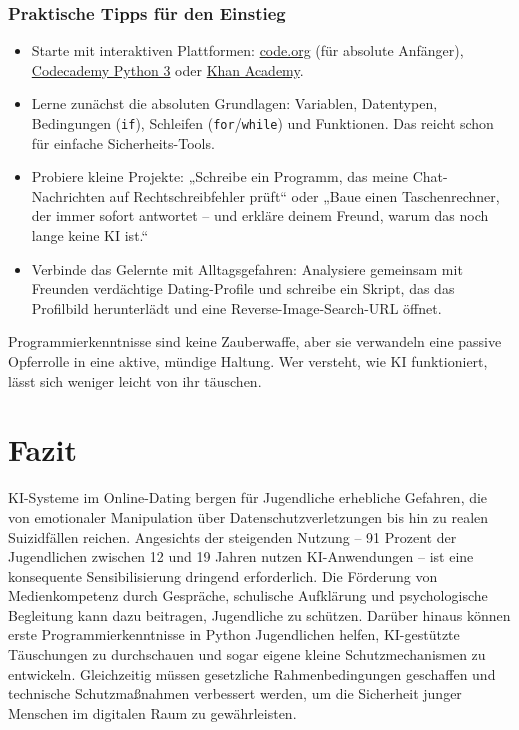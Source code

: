 \documentclass[12pt,a4paper,oneside]{scrartcl}
\begin{document}
	\subsubsection{Praktische Tipps für den Einstieg}
	
	\begin{itemize}
		\item Starte mit interaktiven Plattformen: \href{https://code.org}{code.org} (für absolute Anfänger), \href{https://www.codecademy.com/learn/learn-python-3}{Codecademy Python 3} oder \href{https://www.khanacademy.org/computing/computer-programming}{Khan Academy}.
		\item Lerne zunächst die absoluten Grundlagen: Variablen, Datentypen, Bedingungen (\texttt{if}), Schleifen (\texttt{for}/\texttt{while}) und Funktionen. Das reicht schon für einfache Sicherheits-Tools.
		\item Probiere kleine Projekte: „Schreibe ein Programm, das meine Chat-Nachrichten auf Rechtschreibfehler prüft“ oder „Baue einen Taschenrechner, der immer sofort antwortet – und erkläre deinem Freund, warum das noch lange keine KI ist.“
		\item Verbinde das Gelernte mit Alltagsgefahren: Analysiere gemeinsam mit Freunden verdächtige Dating-Profile und schreibe ein Skript, das das Profilbild herunterlädt und eine Reverse-Image-Search-URL öffnet.
	\end{itemize}
	
	Programmierkenntnisse sind keine Zauberwaffe, aber sie verwandeln eine passive Opferrolle in eine aktive, mündige Haltung. Wer versteht, wie KI funktioniert, lässt sich weniger leicht von ihr täuschen.
	
	\section{Fazit}
	
	KI-Systeme im Online-Dating bergen für Jugendliche erhebliche Gefahren, die von emotionaler Manipulation über Datenschutzverletzungen bis hin zu realen Suizidfällen reichen. Angesichts der steigenden Nutzung – 91 Prozent der Jugendlichen zwischen 12 und 19 Jahren nutzen KI-Anwendungen \cite{JIM2025} – ist eine konsequente Sensibilisierung dringend erforderlich. Die Förderung von Medienkompetenz durch Gespräche, schulische Aufklärung und psychologische Begleitung kann dazu beitragen, Jugendliche zu schützen. Darüber hinaus können erste Programmierkenntnisse in Python Jugendlichen helfen, KI-gestützte Täuschungen zu durchschauen und sogar eigene kleine Schutzmechanismen zu entwickeln. Gleichzeitig müssen gesetzliche Rahmenbedingungen geschaffen und technische Schutzmaßnahmen verbessert werden, um die Sicherheit junger Menschen im digitalen Raum zu gewährleisten.
	
\end{document}
